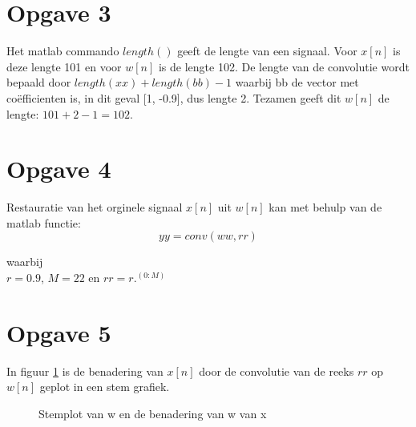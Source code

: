 \documentclass{article}
\begin{document}
\section{Opgave 3}
Het matlab commando $length()$ geeft de lengte van een signaal. Voor $x[n]$ is deze lengte 101 en voor $w[n]$ is de lengte 102. De lengte van de convolutie wordt bepaald door $length(xx)+length(bb)-1$ waarbij bb de vector met co\"efficienten is, in dit geval [1, -0.9], dus lengte 2. Tezamen geeft dit $w[n]$ de lengte:  $101+2-1 = 102$.

\section{Opgave 4}
Restauratie van het orginele signaal $x[n]$ uit $w[n]$ kan met behulp van de matlab functie: 
$$yy = conv(ww, rr)$$
\begin{center}
waarbij\\
$r = 0.9$, $M = 22$ en $rr = r .^ (0:M)$
\end{center}


\section{Opgave 5}
In figuur \ref{opgave5} is de benadering van $x[n]$ door de convolutie van de reeks $rr$ op $w[n]$ geplot in een stem grafiek.
\begin{figure}[h]
  \centering
  \caption{Stemplot van w en de benadering van w van x}
  \label{opgave5}
\end{figure}
\newpage
\end{document}
